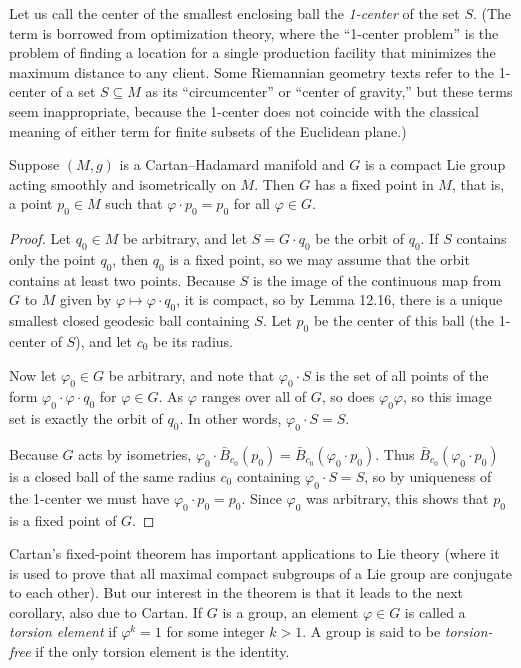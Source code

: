 Let us call the center of the smallest enclosing ball the \emph{1-center} of the set $S$. (The term is borrowed from optimization theory, where the ``1-center problem'' is the problem of finding a location for a single production facility that minimizes the maximum distance to any client. Some Riemannian geometry texts refer to the 1-center of a set $S \subseteq M$ as its ``circumcenter'' or ``center of gravity,'' but these terms seem inappropriate, because the 1-center does not coincide with the classical meaning of either term for finite subsets of the Euclidean plane.)

\begin{theorem}
\label{thm:cartans-fixed-point}
Suppose $(M,g)$ is a Cartan--Hadamard manifold and $G$ is a compact Lie group acting smoothly and isometrically on $M$. Then $G$ has a fixed point in $M$, that is, a point $p_0 \in M$ such that $\varphi \cdot p_0 = p_0$ for all $\varphi \in G$.
\end{theorem}

\begin{proof}
Let $q_0 \in M$ be arbitrary, and let $S = G \cdot q_0$ be the orbit of $q_0$. If $S$ contains only the point $q_0$, then $q_0$ is a fixed point, so we may assume that the orbit contains at least two points. Because $S$ is the image of the continuous map from $G$ to $M$ given by $\varphi \mapsto \varphi \cdot q_0$, it is compact, so by Lemma 12.16, there is a unique smallest closed geodesic ball containing $S$. Let $p_0$ be the center of this ball (the 1-center of $S$), and let $c_0$ be its radius.

Now let $\varphi_0 \in G$ be arbitrary, and note that $\varphi_0 \cdot S$ is the set of all points of the form $\varphi_0 \cdot \varphi \cdot q_0$ for $\varphi \in G$. As $\varphi$ ranges over all of $G$, so does $\varphi_0\varphi$, so this image set is exactly the orbit of $q_0$. In other words, $\varphi_0 \cdot S = S$.

Because $G$ acts by isometries, $\varphi_0 \cdot \bar{B}_{c_0}(p_0) = \bar{B}_{c_0}(\varphi_0 \cdot p_0)$. Thus $\bar{B}_{c_0}(\varphi_0 \cdot p_0)$ is a closed ball of the same radius $c_0$ containing $\varphi_0 \cdot S = S$, so by uniqueness of the 1-center we must have $\varphi_0 \cdot p_0 = p_0$. Since $\varphi_0$ was arbitrary, this shows that $p_0$ is a fixed point of $G$.
\end{proof}

Cartan's fixed-point theorem has important applications to Lie theory (where it is used to prove that all maximal compact subgroups of a Lie group are conjugate to each other). But our interest in the theorem is that it leads to the next corollary, also due to Cartan. If $G$ is a group, an element $\varphi \in G$ is called a \emph{torsion element} if $\varphi^k = 1$ for some integer $k > 1$. A group is said to be \emph{torsion-free} if the only torsion element is the identity.


